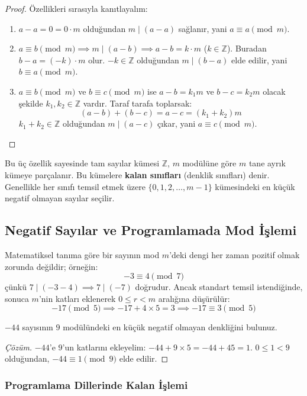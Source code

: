 \begin{proof}
Özellikleri sırasıyla kanıtlayalım:
\begin{enumerate}
    \item $a - a = 0 = 0 \cdot m$ olduğundan $m \mid (a - a)$ sağlanır, yani $a \equiv a \pmod m$.
    \item $a \equiv b \pmod m \implies m \mid (a - b) \implies a - b = k \cdot m$ ($k \in \mathbb{Z}$). Buradan $b - a = (-k) \cdot m$ olur. $-k \in \mathbb{Z}$ olduğundan $m \mid (b - a)$ elde edilir, yani $b \equiv a \pmod m$.
    \item $a \equiv b \pmod m$ ve $b \equiv c \pmod m$ ise $a - b = k_1 m$ ve $b - c = k_2 m$ olacak şekilde $k_1, k_2 \in \mathbb{Z}$ vardır. Taraf tarafa toplarsak:
    \[
    (a - b) + (b - c) = a - c = (k_1 + k_2)m
    \]
    $k_1 + k_2 \in \mathbb{Z}$ olduğundan $m \mid (a - c)$ çıkar, yani $a \equiv c \pmod m$.
\end{enumerate}
\end{proof}

Bu üç özellik sayesinde tam sayılar kümesi $\mathbb{Z}$, $m$ modülüne göre $m$ tane ayrık kümeye parçalanır. Bu kümelere \textbf{kalan sınıfları} (denklik sınıfları) denir. Genellikle her sınıfı temsil etmek üzere $\{0, 1, 2, \dots, m-1\}$ kümesindeki en küçük negatif olmayan sayılar seçilir.

\subsection{Negatif Sayılar ve Programlamada Mod İşlemi}

Matematiksel tanıma göre bir sayının mod $m$'deki dengi her zaman pozitif olmak zorunda değildir; örneğin:
\[
-3 \equiv 4 \pmod 7
\]
çünkü $7 \mid (-3 - 4) \implies 7 \mid (-7)$ doğrudur. Ancak standart temsil istendiğinde, sonuca $m$'nin katları eklenerek $0 \le r < m$ aralığına düşürülür:
\[
-17 \pmod 5 \implies -17 + 4 \times 5 = 3 \implies -17 \equiv 3 \pmod 5
\]

\begin{example}
$-44$ sayısının $9$ modülündeki en küçük negatif olmayan denkliğini bulunuz.
\end{example}

\begin{proof}[Çözüm]
$-44$'e $9$'un katlarını ekleyelim:
$-44 + 9 \times 5 = -44 + 45 = 1$.
$0 \le 1 < 9$ olduğundan, $-44 \equiv 1 \pmod 9$ elde edilir.
\end{proof}

\subsubsection{Programlama Dillerinde Kalan İşlemi}


